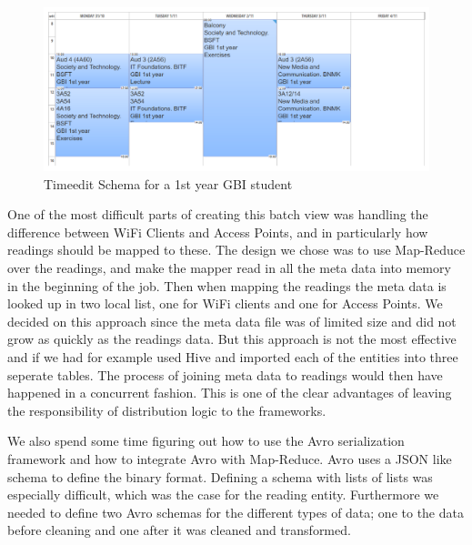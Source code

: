 \begin{figure}[H]
	\centering
	\includegraphics[width=\linewidth]{figures/schema-from-timeedit.png}
	\caption{Timeedit Schema for a 1st year GBI student}
	\label{fig:timeedit_schema}
\end{figure}

\newpar One of the most difficult parts of creating this batch view was handling the difference between WiFi Clients and Access Points, and in particularly how readings should be mapped to these. The design we chose was to use Map-Reduce over the readings, and make the mapper read in all the meta data into memory in the beginning of the job. Then when mapping the readings the meta data is looked up in two local list, one for WiFi clients and one for Access Points. We decided on this approach since the meta data file was of limited size and did not grow as quickly as the readings data. But this approach is not the most effective and if we had for example used Hive and imported each of the entities into three seperate tables. The process of joining meta data to readings would then have happened in a concurrent fashion. This is one of the clear advantages of leaving the responsibility of distribution logic to the frameworks.

\newpar We also spend some time figuring out how to use the Avro serialization framework and how to integrate Avro with Map-Reduce. Avro uses a JSON like schema to define the binary format. Defining a schema with lists of lists was especially difficult, which was the case for the reading entity. Furthermore we needed to define two Avro schemas for the different types of data; one to the data before cleaning and one after it was cleaned and transformed.